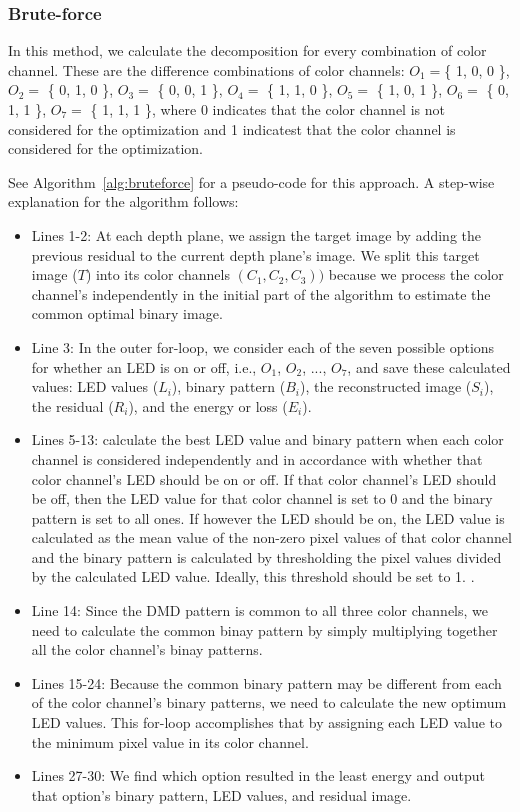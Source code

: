 \subsubsection{Brute-force}
In this method, we calculate the decomposition for every combination of color channel. 
These are the difference combinations of color channels: $O_1 = $\{ 1, 0, 0 \}, $O_2 = $ \{ 0, 1, 0 \}, $O_3 = $ \{ 0, 0, 1 \}, $O_4 = $ \{ 1, 1, 0 \}, $O_5 = $ \{ 1, 0, 1 \}, $O_6 = $ \{ 0, 1, 1 \}, $O_7 = $ \{ 1, 1, 1 \}, where 0 indicates that the color channel is not considered for the optimization and 1 indicatest that the color channel is considered for the optimization. 

See Algorithm~\ref{alg:bruteforce} for a pseudo-code for this approach. A step-wise explanation for the algorithm follows:
\begin{itemize}
    \item Lines 1-2: At each depth plane, we assign the target image by adding the previous residual to the current depth plane's image. We split this target image ($T$) into its color channels $(C_1, C_2, C_3))$ because we process the color channel's independently in the initial part of the algorithm to estimate the common optimal binary image.
    \item Line 3: In the outer for-loop, we consider each of the seven possible options for whether an LED is on or off, i.e., $O_1$, $O_2$, ..., $O_7$, and save these calculated values: LED values ($L_i$), binary pattern ($B_i$), the reconstructed image ($S_i$), the residual ($R_i$), and the energy or loss ($E_i$).
    \item Lines 5-13: calculate the best LED value and binary pattern when each color channel is considered independently and in accordance with whether that color channel's LED should be on or off. If that color channel's LED should be off, then the LED value for that color channel is set to 0 and the binary pattern is set to all ones. If however the LED should be on, the LED value is calculated as the mean value of the non-zero pixel values of that color channel and the binary pattern is calculated by thresholding the pixel values divided by the calculated LED value. Ideally, this threshold should be set to 1. .
    \item Line 14: Since the DMD pattern is common to all three color channels, we need to calculate the common binay pattern by simply multiplying together all the color channel's binay patterns. 
    \item Lines 15-24: Because the common binary pattern may be different from each of the color channel's binary patterns, we need to calculate the new optimum LED values. This for-loop accomplishes that by assigning each LED value to the minimum pixel value in its color channel.
    \item Lines 27-30: We find which option resulted in the least energy and output that option's binary pattern, LED values, and residual image. 
\end{itemize}

